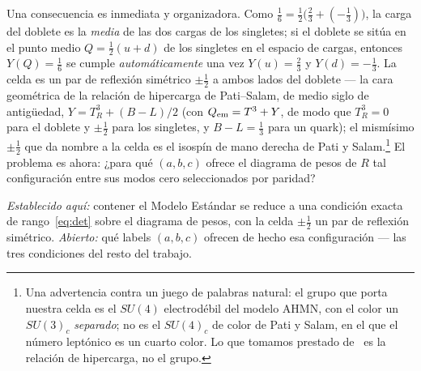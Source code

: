 \documentclass[11pt,a4paper]{article}
\begin{document}
Una consecuencia es inmediata y organizadora. Como
$\tfrac16=\tfrac12\big(\tfrac23+(-\tfrac13)\big)$, la carga del doblete es la \emph{media} de
las dos cargas de los singletes; si el doblete se sitúa en el punto medio $Q=\tfrac12(u+d)$ de
los singletes en el espacio de cargas, entonces $Y(Q)=\tfrac16$ se cumple
\emph{automáticamente} una vez $Y(u)=\tfrac23$ y $Y(d)=-\tfrac13$. La celda es un par de
reflexión simétrico $\pm\tfrac12$ a ambos lados del doblete --- la cara geométrica de la
relación de hipercarga de Pati--Salam, de medio siglo de antigüedad, $Y=T^3_R+(B-L)/2$
\cite{PatiSalam} (con $Q_{\rm em}=T^3+Y$, de modo que $T^3_R=0$ para el doblete y $\pm\tfrac12$
para los singletes, y $B-L=\tfrac13$ para un quark); el mismísimo $\pm\tfrac12$ que da nombre a
la celda es el isospín de mano derecha de Pati y Salam.\footnote{Una advertencia contra un
juego de palabras natural: el grupo que porta nuestra celda es el $SU(4)$ electrodébil del
modelo AHMN, con el color un $SU(3)_c$ \emph{separado}; no es el $SU(4)_c$ de color de Pati y
Salam, en el que el número leptónico es un cuarto color. Lo que tomamos prestado
de~\cite{PatiSalam} es la relación de hipercarga, no el grupo.} El problema es ahora: ¿para qué
$(a,b,c)$ ofrece el diagrama de pesos de $R$ tal configuración entre sus modos cero
seleccionados por paridad?

\emph{Establecido aquí:} contener el Modelo Estándar se reduce a una condición exacta de
rango~\eqref{eq:det} sobre el diagrama de pesos, con la celda $\pm\tfrac12$ un par de reflexión
simétrico. \emph{Abierto:} qué labels $(a,b,c)$ ofrecen de hecho esa configuración --- las tres
condiciones del resto del trabajo.

\end{document}
